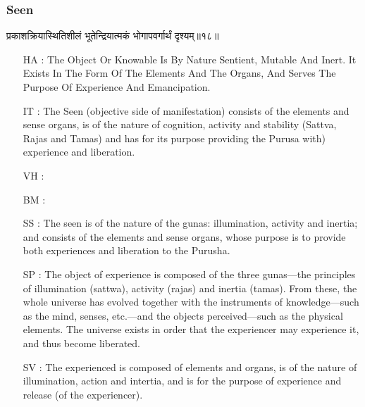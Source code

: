 \begin{frame}[fragile]\frametitle{Seen}
\begin{sanskrit}
प्रकाशक्रियास्थितिशीलं भूतेन्द्रियात्मकं भोगापवर्गार्थं दृश्यम्॥१८॥
\end{sanskrit}

	\begin{itemize}
	\item [HA]: The Object Or Knowable Is By Nature Sentient, Mutable And Inert. It Exists In The Form Of The Elements And The Organs, And Serves The Purpose Of Experience And Emancipation.
	\item [IT]: The Seen (objective side of manifestation) consists of the elements and sense organs, is of the nature of cognition, activity and stability (Sattva, Rajas and Tamas) and has for its purpose providing the Purusa with) experience and liberation.
	\item [VH]: 
	\item [BM]: 
	\item [SS]: The seen is of the nature of the gunas: illumination, activity and inertia; and consists of the elements and sense organs, whose purpose is to provide both experiences and liberation to the Purusha.
	\item [SP]: The object of experience is composed of the three gunas—the principles of illumination (sattwa), activity (rajas) and inertia (tamas). From these, the whole universe has evolved together with the instruments of knowledge—such as the mind, senses, etc.—and the objects perceived—such as the physical elements. The universe exists in order that the experiencer may experience it, and thus become liberated.
	\item [SV]: The experienced is composed of elements and organs, is of the nature of illumination, action and intertia, and is for the purpose of experience and release (of the experiencer).

  
	\end{itemize}
\end{frame}


